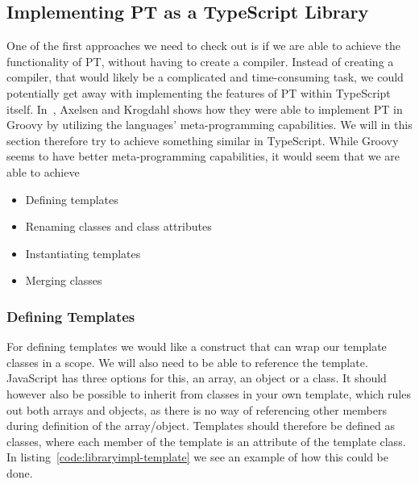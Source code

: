 \subsection{Implementing PT as a TypeScript Library}\label{subsec:implementing-pt-as-a-ts-library}


One of the first approaches we need to check out is if we are able to achieve the functionality of PT, without having to create a compiler.
Instead of creating a compiler, that would likely be a complicated and time-consuming task, we could potentially get away with implementing the features of PT within TypeScript itself.
In~\cite{groovypt}, Axelsen and Krogdahl shows how they were able to implement PT in Groovy by utilizing the languages' meta-programming capabilities.
We will in this section therefore try to achieve something similar in TypeScript.
While Groovy seems to have better meta-programming capabilities, it would seem that we are able to achieve


\begin{itemize}
    \item Defining templates
    \item Renaming classes and class attributes
    \item Instantiating templates
    \item Merging classes
\end{itemize}

\subsubsection{Defining Templates}\label{subsubsec:defining-templates}

For defining templates we would like a construct that can wrap our template classes in a scope.
We will also need to be able to reference the template.
JavaScript has three options for this, an array, an object or a class.
It should however also be possible to inherit from classes in your own template, which rules out both arrays and objects, as there is no way of referencing other members during definition of the array/object.
Templates should therefore be defined as classes, where each member of the template is an attribute of the template class.
In listing~\vref{code:libraryimpl-template} we see an example of how this could be done.

